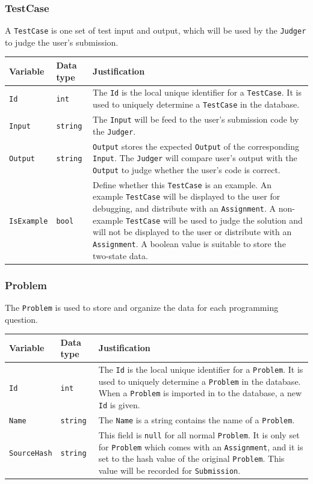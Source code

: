 \documentclass[a4paper]{report}
\newcommand{\code}{\texttt}
\begin{document}
\subsubsection{TestCase}

A \code{TestCase} is one set of test input and output, which will be used by the \code{Judger} to judge the user's submission.

\begin{tabulary}{\textwidth}{|l|l|L|}
    \hline
    Variable & Data type & Justification \\
    \hline
    \code{Id} & \code{int} & The \code{Id} is the local unique identifier for a \code{TestCase}. It is used to uniquely determine a \code{TestCase} in the database. \\
    \hline
    \code{Input} & \code{string} & The \code{Input} will be feed to the user's submission code by the \code{Judger}. \\
    \hline
    \code{Output} & \code{string} & \code{Output} stores the expected \code{Output} of the corresponding \code{Input}. The \code{Judger} will compare user's output with the \code{Output} to judge whether the user's code is correct. \\
    \hline
    \code{IsExample} & \code{bool} & Define whether this \code{TestCase} is an example. An example \code{TestCase} will be displayed to the user for debugging, and distribute with an \code{Assignment}. A non-example \code{TestCase} will be used to judge the solution and will not be displayed to the user or distribute with an \code{Assignment}. A boolean value is suitable to store the two-state data. \\
    \hline
\end{tabulary}

\subsubsection{Problem}

The \code{Problem} is used to store and organize the data for each programming question.

\begin{tabulary}{\textwidth}{|l|l|L|}
    \hline
    Variable & Data type & Justification \\
    \hline
    \code{Id} & \code{int} & The \code{Id} is the local unique identifier for a \code{Problem}. It is used to uniquely determine a \code{Problem} in the database. When a \code{Problem} is imported in to the database, a new \code{Id} is given. \\
    \hline
    \code{Name} & \code{string} & The \code{Name} is a string contains the name of a \code{Problem}. \\
    \hline
    \code{SourceHash} & \code{string} & This field is \code{null} for all normal \code{Problem}. It is only set for \code{Problem} which comes with an \code{Assignment}, and it is set to the hash value of the original \code{Problem}. This value will be recorded for \code{Submission}. \\
    \hline
\end{tabulary}
\end{document}
